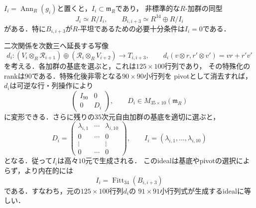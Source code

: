 \begin{proposition}[次数三の障害idealと有限行列]
\label{prop:abel-degree-three-obstruction}
$I_i=\operatorname{Ann}_R(g_i)$と置くと，$I_i\subset\mathfrak m_R$であり，
非標準的な$R$-加群の同型
\[
 J_i\simeq R/I_i,
 \qquad B_{i,i+3}\simeq R^{34}\oplus R/I_i
\]
がある．特に$B_{i,i+3}$が$R$-平坦であるための必要十分条件は$I_i=0$である．

二次関係を次数三へ延長する写像
\[
 d_i:(V_i\otimes_R\mathcal R_{i+1})
       \oplus(\mathcal R_i\otimes_R V_{i+2})
       \longrightarrow T_{i,i+3},
 \qquad d_i(v\otimes r,r'\otimes v')=vr+r'v'
\]
を考える．各加群の基底を選ぶと，これは$125\times100$行列であり，
その特殊化のrankは$90$である．特殊化後非零となる$90\times90$小行列を
pivotとして消去すれば，$d_i$は可逆な行・列操作により
\[
 \begin{pmatrix}I_{90}&0\\0&D_i\end{pmatrix},
 \qquad D_i\in M_{35\times10}(\mathfrak m_R)
\]
に変形できる．さらに残りの$35$次元自由加群の基底を適切に選ぶと，
\[
 D_i=
 \begin{pmatrix}
  \lambda_{i,1}&\cdots&\lambda_{i,10}\\
  0&\cdots&0\\
  \vdots&&\vdots\\
  0&\cdots&0
 \end{pmatrix},
 \qquad
 I_i=(\lambda_{i,1},\ldots,\lambda_{i,10})
\]
となる．従って$I_i$は高々$10$元で生成される．
このidealは基底やpivotの選択によらず，より内在的には
\[
 I_i=\operatorname{Fitt}_{34}(B_{i,i+3})
\]
である．すなわち，元の$125\times100$行列$d_i$の
$91\times91$小行列式が生成するidealに等しい．
\end{proposition}

